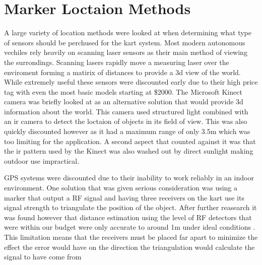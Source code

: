 \section{Marker Loctaion Methods}

A large variety of location methods were looked at when determining what type of sensors should be perchused for the kart system. Most modern autonomous vechiles rely heavily on scanning laser sensors as their main method of viewing the surrondings. Scanning lasers rapidly move a measuring laser over the enviroment forming a matirix of distances to provide a 3d view of the world. While extremely useful these sensors were discounted early due to their high price tag with even the most basic models starting at \$2000. The Microsoft Kinect camera was briefly looked at as an alternative solution that would provide 3d information about the world. This camera used structured light combined with an ir camera to detect the loctaion of objects in its field of view. This was also quickly discounted however as it had a maximum range of only 3.5m which was too limiting for the application. A second aspect that counted against it was that the ir pattern used by the Kinect was also washed out by direct sunlight making outdoor use impractical.

GPS systems were discounted due to their inability to work reliably in an indoor environment. One solution that was given serious consideration was using a marker that output a RF signal and having three receivers on the kart use its signal strength to triangulate the position of the object. After further reasearch it was found however that distance estimation using the level of RF detectors that were within our budget were only accurate to around 1m under ideal conditions \cite{rf}. This limitation means that the receivers must be placed far apart to minimize the effect the error would have on the direction the triangulation would calculate the signal to have come from